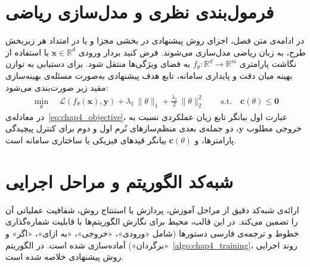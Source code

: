 \section{فرمول‌بندی نظری و مدل‌سازی ریاضی}\label{sec:4-2}

در ادامه‌ی متن فصل، اجزای روش پیشنهادی در بخشی مجزا و یا در امتداد هر زیربخش طرح، به زبان ریاضی مدل‌سازی می‌شوند. فرض کنید بردار ورودی $\mathbf{x} \in \mathbb{R}^d$ با استفاده از نگاشت پارامتری $f_\theta: \mathbb{R}^d \to \mathbb{R}^m$ به فضای ویژگی‌ها منتقل شود. برای دستیابی به توازن بهینه میان دقت و پایداری سامانه، تابع هدف پیشنهادی به‌صورت مسئله‌ی بهینه‌سازی مقید زیر صورت‌بندی می‌شود:
\begin{equation}\label{eq:chap4_objective}
    \begin{aligned}
        \min_{\theta} \quad \mathcal{L}(f_\theta(\mathbf{x}), \mathbf{y}) + \lambda_1 \, \|\theta\|_1 + \frac{\lambda_2}{2} \, \|\theta\|_2^2 \qquad \text{s.t.} \quad \mathbf{c}(\theta) \le \mathbf{0}
    \end{aligned}
\end{equation}
در معادله‌ی~\eqref{eq:chap4_objective}، عبارت اول بیانگر تابع زیان عملکردی نسبت به خروجی مطلوب $\mathbf{y}$، دو جمله‌ی بعدی منظم‌سازهای نُرم اول و دوم برای کنترل پیچیدگی پارامترها، و $\mathbf{c}(\theta)$ بیانگر قیدهای فیزیکی یا ساختاری سامانه است.


\section{شبه‌کد الگوریتم و مراحل اجرایی}\label{sec:4-3}

ارائه‌ی شبه‌کد دقیق از مراحل آموزش، پردازش یا استنتاج روش، شفافیت عملیاتی آن را تضمین می‌کند. در این قالب، محیط  برای نگارش الگوریتم‌ها با قابلیت شماره‌گذاری خطوط و ترجمه‌ی فارسی دستورها (شامل «ورودی»، «خروجی»، «به ازای»، «اگر» و «برگردان») آماده‌سازی شده است. در الگوریتم~\ref{algo:chap4_training}، روند اجرایی روش پیشنهادی خلاصه شده است.

